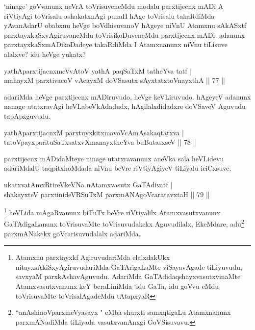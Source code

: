 \begin{artha}
\stext `ninage'  goVvanunx neVrA toVrisuveneMdu modalu parxtijecnx mADi A riVtiyAgi toVrisalu ashakatxnAgi punaH hAge toVrisalu takaRdiMda yAvanAdarU obabxnu heVge boVdhisuvanoV hAgeye niVnU Atamxnu sAkASxtf parxtayxkaSxvAgiruvaneMdu toVrisikoDuveneMdu parxtijecnx mADi. adanunx parxtayxkaSxmADikoDadeye takaRdiMda I Atamxnanunx niVnu tiLisuve alalxve? idu heVge yukatx?
\end{artha}

\begin{shl}
yathAparxtijacnxmeVvAtoV yathA paqSaTxM tatheYva tatf |\\
mahayxM parxtivacoV vAcayxM doVSasutx sAyxtatxtoV\s nayxthA \hfill || 77 ||
\end{shl}

\begin{artha}%
adariMda heVge parxtijecnx mADiruvudo, heVge keVLiruvudo. hAgeyeV adanunx nanage utatxravAgi heVLabeVkAdadudx, hAgilalxdidadxre doVSaveV Aguvudu tapApxguvudu.
\end{artha}


\begin{shl}
yathAparxtijacnxM parxtuyxkitxmavoVcAmAsakaqtatxva |\\
tatoV\s payxparituSaTxsatxvXmanayxtheYva buButasxseV \hfill || 78 ||
\end{shl}

\begin{artha}
parxtijecnx mADidaMteye ninage utatxravanunx aneVka sala heVLidevu adariMdalU taqpitxhoMdada niVnu beVre riVtiyAgiyeV tiLiyalu iciCxsuve. 
\end{artha}


\begin{shl}
ukatxvatAmxRtireVkeVNa nA\s \s tamxvasutx GaTAdivatf |\\
shakayxteV parxtinideVRSuTxM parxmANAgoVcaratavxtaH \hfill || 79 ||
\end{shl}

\begin{artha}
\footnote[1]{Atamxnu parxtayxkf AgiruvudariMda elalxdakUkx nitayxsAkiSxyAgiruvudariMda GaTArigaLaMte viSayavAgade tiLiyuvudu, savxyaM parxkAshavAguvudu. AdariMda GaTAdidaqshayxvasutxvinaMte Atamxvasutxvanunx keY beraLiniMda `idu GaTa, idu goVvu eMdu toVrisuvaMte toVrisalAgadeMdu tAtapxyaR} heVLida mAgaRvanunx biTuTx beVre riVtiyalilx Atamxvasutxvanunx GaTAdigaLanunx toVrisuvaMte toVrisuvudakekx Aguvudilalx, EkeMdare, adu\footnote[2]{``anAshinoV\s parxmeVyasayx " eMba shurxti samxqtigaLu Atamxnanunx parxmANadiMda tiLiyada vasutxvanAnxgi GoVSisuvavu.} parxmANakekx goVcarisuvudalalx adariMda.
\end{artha}

